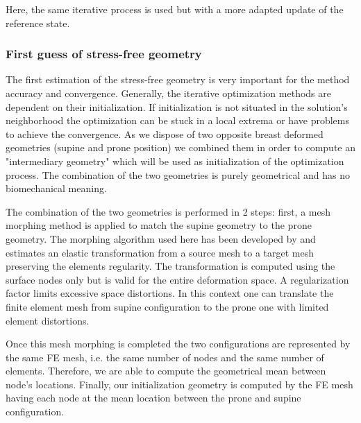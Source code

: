 Here, the same iterative process is used but with a more adapted update of the reference state.




\subsubsection*{First guess of stress-free geometry}
The first estimation of the stress-free geometry is very important for the method accuracy and convergence. Generally, the iterative optimization methods are dependent on their initialization. If initialization is not situated in the solution's neighborhood the optimization can be stuck in a local extrema or have problems to achieve the convergence. As we dispose of two opposite breast deformed geometries (supine and prone position) we combined them in order to compute an "intermediary geometry" which will be used as initialization of the optimization process. The combination of the two geometries is purely geometrical and has no biomechanical meaning.

The combination of the two geometries is performed in 2 steps: first, a mesh morphing method is applied to match the supine geometry to the prone geometry. The morphing algorithm used here has been developed by \cite{bucki_fast_2010} and estimates an elastic transformation from a source mesh to a target mesh preserving the elements regularity. The transformation is computed using the surface nodes only but is valid for the entire deformation space. A regularization factor limits excessive space distortions. In this context one can translate the finite element mesh from supine configuration to the prone one with limited element distortions.

Once this mesh morphing is completed the two configurations are represented by the same FE mesh, i.e. the same number of nodes and the same number of elements. Therefore, we are able to compute the geometrical mean between node's locations. Finally, our initialization geometry is computed by the FE mesh having each node at the mean location between the prone and supine configuration. 
 
